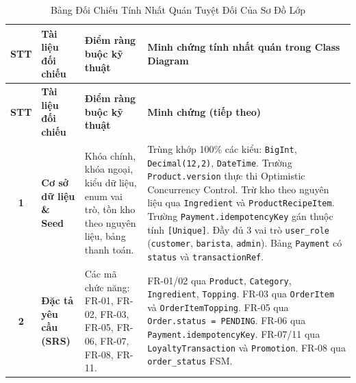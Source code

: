 \documentclass[12pt,a4paper]{article}
\begin{document}
\begin{xltabular}{\textwidth}{|c|>{\raggedright\arraybackslash}p{3.8cm}|>{\raggedright\arraybackslash}p{3.8cm}|>{\raggedright\arraybackslash}X|}
\caption{Bảng Đối Chiếu Tính Nhất Quán Tuyệt Đối Của Sơ Đồ Lớp} \label{tab:consistency} \\
\hline
{}
\textbf{STT} & \textbf{Tài liệu đối chiếu} & \textbf{Điểm ràng buộc kỹ thuật} & \textbf{Minh chứng tính nhất quán trong Class Diagram} \\
\hline
\endfirsthead

\hline
{}
\textbf{STT} & \textbf{Tài liệu đối chiếu} & \textbf{Điểm ràng buộc kỹ thuật} & \textbf{Minh chứng (tiếp theo)} \\
\hline
\endhead

\hline
\endfoot

\hline
\endlastfoot

\textbf{1} & \textbf{Cơ sở dữ liệu \& Seed}\newline{}\newline{} & Khóa chính, khóa ngoại, kiểu dữ liệu, enum vai trò, tồn kho theo nguyên liệu, bảng thanh toán. & 
Trùng khớp 100\% các kiểu: \texttt{BigInt}, \texttt{Decimal(12,2)}, \texttt{DateTime}.\newline
Trường \texttt{Product.version} thực thi Optimistic Concurrency Control.\newline
Trừ kho theo nguyên liệu qua \texttt{Ingredient} và \texttt{ProductRecipeItem}.\newline
Trường \texttt{Payment.idempotencyKey} gán thuộc tính \texttt{[Unique]}.\newline
Đầy đủ 3 vai trò \texttt{user\_role} (\texttt{customer}, \texttt{barista}, \texttt{admin}).\newline
Bảng \texttt{Payment} có \texttt{status} và \texttt{transactionRef}. \\
\hline

\textbf{2} & \textbf{Đặc tả yêu cầu (SRS)}\newline{} & Các mã chức năng: FR-01, FR-02, FR-03, FR-05, FR-06, FR-07, FR-08, FR-11. & 
FR-01/02 qua \texttt{Product}, \texttt{Category}, \texttt{Ingredient}, \texttt{Topping}.\newline
FR-03 qua \texttt{OrderItem} và \texttt{OrderItemTopping}.\newline
FR-05 qua \texttt{Order.status = PENDING}.\newline
FR-06 qua \texttt{Payment.idempotencyKey}.\newline
FR-07/11 qua \texttt{LoyaltyTransaction} và \texttt{Promotion}.\newline
FR-08 qua \texttt{order\_status} FSM. \\
\hline


\end{xltabular}
\end{document}
